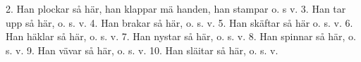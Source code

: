 2.  Han plockar så här, han klappar mä handen, han stampar o. s v.
3.  Han tar upp så här, o. s. v.
4.  Han brakar så här, o. s. v.
5.  Han skäftar så här o. s. v.
6.  Han häklar så här, o. s. v.
7.  Han nystar så här, o. s. v.
8.  Han spinnar så här, o. s. v.
9.  Han vävar så här, o. s. v.
10. Han släitar så här, o. s. v.
